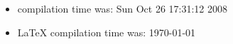 \documentclass[a4paper]{article}
\begin{document}
\begin{itemize}
  \item \Rlogo{} compilation time was: Sun Oct 26 17:31:12 2008
  \item \LaTeX{} compilation time was: \today
\end{itemize}






\end{document}
